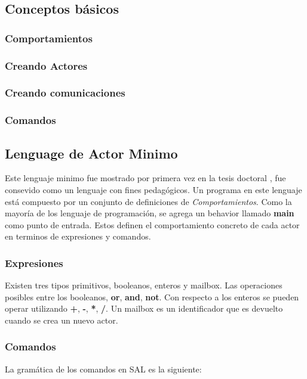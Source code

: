 \documentclass[fleqn]{article}
\begin{document}
\subsection{Conceptos básicos}

\subsubsection*{Comportamientos}

\subsubsection*{Creando Actores}

\subsubsection*{Creando comunicaciones}

\subsubsection*{Comandos}

\subsection{Lenguage de Actor Minimo}

Este lenguaje minimo fue mostrado por primera vez en la tesis doctoral
\cite{Agha:1986:AMC:7929}, fue consevido como un lenguaje  con fines pedagógicos.
Un programa en este lenguaje está compuesto por un conjunto de definiciones de
\textit{Comportamientos}. Como la mayoría de los lenguaje de programación,
se agrega un behavior llamado \textbf{main} como punto de entrada.
Estos definen el comportamiento concreto de cada actor en terminos de
expresiones y comandos.

\subsubsection{Expresiones}

Existen tres tipos primitivos, booleanos, enteros y mailbox. Las operaciones
posibles entre los booleanos, \textbf{or}, \textbf{and}, \textbf{not}. Con
respecto a los enteros se pueden operar utilizando \textbf{+}, \textbf{-},
\textbf{*}, \textbf{/}. Un mailbox es un identificador que es devuelto cuando se
crea un nuevo actor.

\subsubsection{Comandos}
La gramática de los comandos en SAL es la siguiente:
\end{document}
